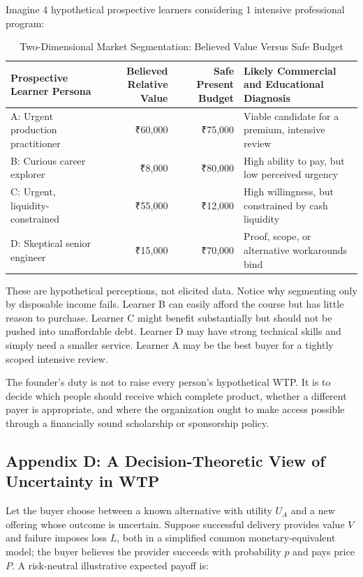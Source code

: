 Imagine 4 hypothetical prospective learners considering 1 intensive professional program:

\begin{table}[t]
\centering
\small
\caption{Two-Dimensional Market Segmentation: Believed Value Versus Safe Budget}
\begin{tabularx}{\textwidth}{p{}rrX}
\toprule
\textbf{Prospective Learner Persona} & \textbf{Believed Relative Value} & \textbf{Safe Present Budget} & \textbf{Likely Commercial and Educational Diagnosis} \\
\midrule
A: Urgent production practitioner & ₹60,000 & ₹75,000 & Viable candidate for a premium, intensive review \\
B: Curious career explorer & ₹8,000 & ₹80,000 & High ability to pay, but low perceived urgency \\
C: Urgent, liquidity-constrained & ₹55,000 & ₹12,000 & High willingness, but constrained by cash liquidity \\
D: Skeptical senior engineer & ₹15,000 & ₹70,000 & Proof, scope, or alternative workarounds bind \\
\bottomrule
\end{tabularx}
\end{table}

These are hypothetical perceptions, not elicited data. Notice why segmenting only by disposable income fails. Learner B can easily afford the course but has little reason to purchase. Learner C might benefit substantially but should not be pushed into unaffordable debt. Learner D may have strong technical skills and simply need a smaller service. Learner A may be the best buyer for a tightly scoped intensive review.

The founder's duty is not to raise every person's hypothetical WTP. It is to decide which people should receive which complete product, whether a different payer is appropriate, and where the organization ought to make access possible through a financially sound scholarship or sponsorship policy.

\subsection*{Appendix D: A Decision-Theoretic View of Uncertainty in WTP}

Let the buyer choose between a known alternative with utility $U_A$ and a new offering whose outcome is uncertain. Suppose successful delivery provides value $V$ and failure imposes loss $L$, both in a simplified common monetary-equivalent model; the buyer believes the provider succeeds with probability $p$ and pays price $P$. A risk-neutral illustrative expected payoff is:

